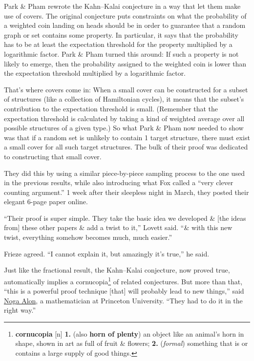 \documentclass[oneside]{book}
\numberwithin{equation}{section}
\begin{document}
Park \& Pham rewrote the Kahn--Kalai conjecture in a way that let them make use of covers. The original conjecture puts constraints on what the probability of a weighted coin landing on heads should be in order to guarantee that a random graph or set contains some property. In particular, it says that the probability has to be at least the expectation threshold for the property multiplied by a logarithmic factor. Park \& Pham turned this around: If such a property is not likely to emerge, then the probability assigned to the weighted coin is lower than the expectation threshold multiplied by a logarithmic factor.

That's where covers come in: When a small cover can be constructed for a subset of structures (like a collection of Hamiltonian cycles), it means that the subset's contribution to the expectation threshold is small. (Remember that the expectation threshold is calculated by taking a kind of weighted average over all possible structures of a given type.) So what Park \& Pham now needed to show was that if a random set is unlikely to contain 1 target structure, there must exist a small cover for all such target structures. The bulk of their proof was dedicated to constructing that small cover.

They did this by using a similar piece-by-piece sampling process to the one used in the previous results, while also introducing what Fox called a ``very clever counting argument.'' 1 week after their sleepless night in March, they posted their elegant 6-page paper online.

``Their proof is super simple. They take the basic idea we developed \& [the ideas from] these other papers \& add a twist to it,'' Lovett said. ``\& with this new twist, everything somehow becomes much, much easier.''

Frieze agreed. ``I cannot explain it, but amazingly it's true,'' he said.

Just like the fractional result, the Kahn--Kalai conjecture, now proved true, automatically implies a cornucopia\footnote{\textbf{cornucopia} [n] \textbf{1.} (also \textbf{horn of plenty}) an object like an animal's horn in shape, shown in art as full of fruit \& flowers; \textbf{2.} (\textit{formal}) something that is or contains a large supply of good things.} of related conjectures. But more than that, ``this is a powerful proof technique [that] will probably lead to new things,'' said \href{https://web.math.princeton.edu/~nalon/}{Noga Alon}, a mathematician at Princeton University. ``They had to do it in the right way.''
\end{document}

